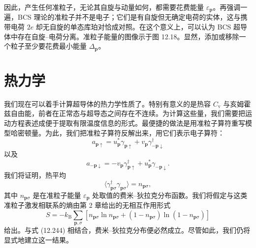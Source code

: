 因此，产生任何准粒子，无论其自旋与动量如何，都需要花费能量 $\varepsilon_{\mathbf{p}}$。再强调一遍，BCS 理论的准粒子并不是电子；它们是有自旋但无确定电荷的实体，这与携带电荷 $2e$ 却无自旋的单态库珀对恰成对照。在这个意义上，可以认为 BCS 超导体中存在自旋–电荷分离。准粒子能量的图像示于图 12.18。显然，添加或移除一个粒子至少要花费最小能量 $\Delta_{\mathbf{p}}$。

\section{热力学}

我们现在可以着手计算超导体的热力学性质了。特别有意义的是热容 $C_{\mathrm{v}}$ 与亥姆霍兹自由能，前者在正常态与超导态之间存在不连续。为计算这些量，我们需要把运动方程表述成便于提取有限温度信息的形式。最便捷的做法是用准粒子算符重写模型哈密顿量。为此，我们把准粒子算符反解出来，用它们表示电子算符：
\begin{equation*}
a_{\mathbf{p}\uparrow}=u_{\mathbf{p}}^{*}\gamma_{\mathbf{p}\uparrow}+v_{\mathbf{p}}\gamma_{-\mathbf{p}\downarrow}^{\dagger}\tag{12.245}
\end{equation*}
以及
\begin{equation*}
a_{-\mathbf{p}\downarrow}=-v_{\mathbf{p}}\gamma_{\mathbf{p}\uparrow}^{\dagger}+u_{\mathbf{p}}^{*}\gamma_{-\mathbf{p}\downarrow}.\tag{12.246}
\end{equation*}
我们将证明，热平均
\begin{equation*}
\langle\gamma_{\mathbf{p}\sigma}^{\dagger}\gamma_{\mathbf{p}\sigma}\rangle=n_{\mathbf{p}\sigma},\tag{12.247}
\end{equation*}
其中 $n_{\mathbf{p}\sigma}$ 是在准粒子能量 $\varepsilon_{\mathbf{p}}$ 处取值的费米–狄拉克分布函数。我们将假定与这类准粒子激发相联系的熵由第 2 章给出的无相互作用形式
\begin{equation*}
S=-k_{\mathrm{B}}\sum_{\mathbf{p},\sigma}\left[n_{\mathbf{p}\sigma}\ln n_{\mathbf{p}\sigma}+\left(1-n_{\mathbf{p}\sigma}\right)\ln\left(1-n_{\mathbf{p}\sigma}\right)\right]\tag{12.248}
\end{equation*}
给出。与式 (12.244) 相结合，费米–狄拉克分布便必然成立。尽管如此，我们仍将显式地建立这一结果。

